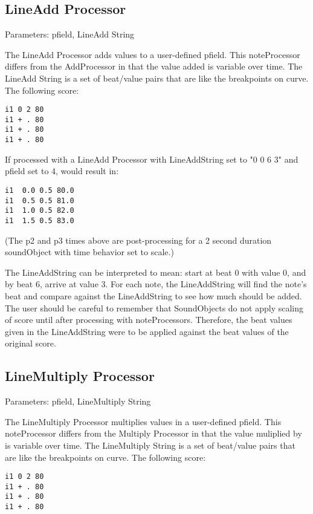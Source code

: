 \subsection{LineAdd Processor}\label{lineAddProcessor}

Parameters: pfield, LineAdd String

The LineAdd Processor adds values to a user-defined pfield. This
noteProcessor differs from the AddProcessor in that the value added is
variable over time. The LineAdd String is a set of beat/value pairs that
are like the breakpoints on curve. The following score:

\begin{verbatim}
i1 0 2 80
i1 + . 80
i1 + . 80
i1 + . 80
\end{verbatim}

If processed with a LineAdd Processor with LineAddString set to "0 0 6
3" and pfield set to 4, would result in:

\begin{verbatim}
i1  0.0 0.5 80.0
i1  0.5 0.5 81.0
i1  1.0 0.5 82.0
i1  1.5 0.5 83.0
\end{verbatim}

(The p2 and p3 times above are post-processing for a 2 second duration
soundObject with time behavior set to scale.)

The LineAddString can be interpreted to mean: start at beat 0 with value
0, and by beat 6, arrive at value 3. For each note, the LineAddString
will find the note's beat and compare against the LineAddString to see
how much should be added. The user should be careful to remember that
SoundObjects do not apply scaling of score until after processing with
noteProcessors. Therefore, the beat values given in the LineAddString
were to be applied against the beat values of the original score.


\subsection{LineMultiply Processor}\label{lineMultiplyProcessor}

Parameters: pfield, LineMultiply String

The LineMultiply Processor multiplies values in a user-defined pfield.
This noteProcessor differs from the Multiply Processor in that the value
muliplied by is variable over time. The LineMultiply String is a set of
beat/value pairs that are like the breakpoints on curve. The following
score:

\begin{verbatim}
i1 0 2 80
i1 + . 80
i1 + . 80
i1 + . 80
\end{verbatim}

